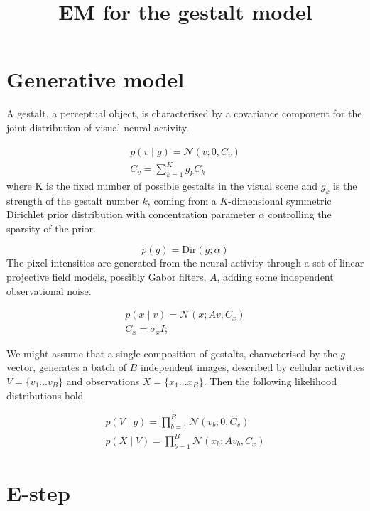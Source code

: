 \documentclass{paper}
\begin{document}
\title{EM for the gestalt model}
\maketitle

\section{Generative model}

A gestalt, a perceptual object, is characterised by a covariance component for the joint distribution of visual neural activity. 

\begin{eqnarray}
p(v \mid g) = \mathcal{N}(v; 0,C_v) \\
C_v = \sum_{k=1}^K g_k C_k \label{eq:cv}
\end{eqnarray}
%
where K is the fixed number of possible gestalts in the visual scene and $g_k$ is the strength of the gestalt number $k$, coming from a $K$-dimensional symmetric Dirichlet prior distribution with concentration parameter $\alpha$ controlling the sparsity of the prior.

\begin{equation}
p(g) = \textrm{Dir}(g; \alpha)
\end{equation}
%
The pixel intensities are generated from the neural activity through a set of linear projective field models, possibly Gabor filters, $A$, adding some independent observational noise.

\begin{eqnarray}
p(x \mid v) = \mathcal{N}(x; Av,C_x) \\
C_x = \sigma_x I;
\end{eqnarray}

We might assume that a single composition of gestalts, characterised by the $g$ vector, generates a batch of $B$ independent images, described by cellular activities $V = \lbrace v_1 \dots v_B \rbrace$ and observations $X = \lbrace x_1 \dots x_B \rbrace$. Then the following likelihood distributions hold

\begin{eqnarray}
p(V \mid g) = \prod_{b=1}^B \mathcal{N}(v_b; 0,C_v) \\
p(X \mid V) = \prod_{b=1}^B \mathcal{N}(x_b; Av_b,C_x)
\end{eqnarray}

\section{E-step}
\end{document}
